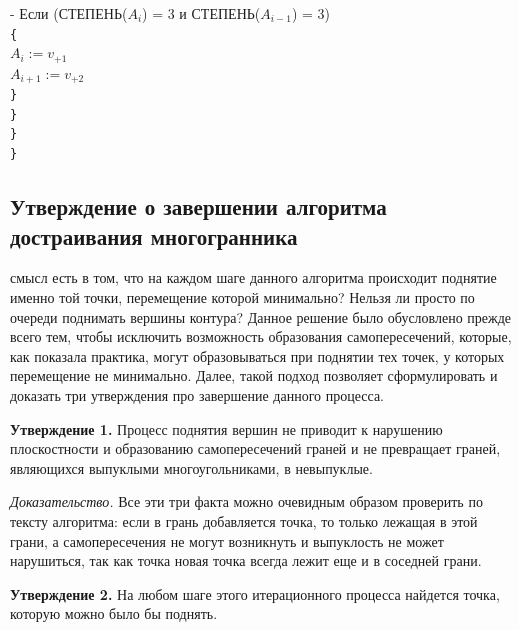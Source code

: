 \documentclass[a4paper,12pt, titlepage]{article}
\begin{document}
\begin{flushleft}
\quad\quad{} - Если (СТЕПЕНЬ($A_{i}$) = 3 и СТЕПЕНЬ($A_{i - 1}$) = 3)\\
\quad\quad\quad\verb"{"\\
\quad\quad\quad\quad$A_{i} := v_{+1}$\\
\quad\quad\quad\quad$A_{i + 1} := v_{+2}$\\
\quad\quad\quad\verb"}"\\

\quad\quad\verb"}"\\
\quad\verb"}"\\
\verb"}"\\

\end{flushleft}

\subsection{Утверждение о завершении алгоритма достраивания многогранника}

\begin{flushleft}
  смысл есть в том, что на каждом шаге данного алгоритма происходит поднятие именно той точки,
перемещение которой минимально? Нельзя ли просто по очереди поднимать вершины контура? Данное решение
было обусловлено прежде всего тем, чтобы исключить возможность образования самопересечений, которые,
как показала практика, могут образовываться при поднятии тех точек, у которых перемещение не минимально.
Далее, такой подход позволяет сформулировать и доказать три утверждения про завершение данного процесса.
\end{flushleft}

\begin{flushleft}
 \textbf{Утверждение 1.} Процесс поднятия вершин не приводит к нарушению плоскостности и образованию 
самопересечений граней и не превращает граней, являющихся выпуклыми многоугольниками, в невыпуклые.
\end{flushleft}

\begin{flushleft}
 \textit{Доказательство.} Все эти три факта можно очевидным образом проверить по тексту алгоритма:
если в грань добавляется точка, то только лежащая в этой грани, а самопересечения не могут возникнуть
и выпуклость не может нарушиться, так как точка новая точка всегда лежит еще и в соседней грани.
\end{flushleft}

\begin{flushleft}
 \textbf{Утверждение 2.} На любом шаге этого итерационного процесса найдется точка, которую можно было
бы поднять.
\end{flushleft}
\end{document}
